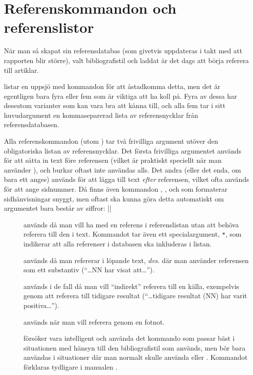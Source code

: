 \documentclass[10pt,../../a4.tex]{subfiles}
\begin{document}
\section{Referenskommandon och referenslistor}
När man så skapat sin referensdatabas (som givetvis uppdateras i takt med
att rapporten blir större), valt bibliografistil och laddat
 är det dags att börja referera till artiklar.

\Textcite[\ppno~79\psqq]{Lehman13} listar en uppsjö med kommandon för att
åstadkomma detta, men det är egentligen bara fyra eller fem som är viktiga
att ha koll på. Fyra av dessa har dessutom varianter som kan vara bra att
känna till, och alla fem tar i sitt huvudargument en kommaseparerad lista
av referensnycklar från referensdatabasen.

Alla referenskommandon (utom ) tar två frivilliga argument
utöver den obligatoriska listan av referensnycklar. Det första frivilliga
argumentet används för att sätta in text före referensen (vilket är
praktiskt speciellt när man använder ), och burkar oftast
inte användas alls. Det andra (eller det enda, om bara ett anges) används
för att lägga till text \emph{efter} referensen, vilket ofta används för
att ange sidnummer. Då finns även kommandon , ,
 och  som formaterar sidhänvisningar snyggt, men oftast
ska  kunna göra detta automatiskt om argumentet bara består
av siffror:
\latex|\parencite[12-14]{Lehman13}|

\begin{description}
	\item[] används då man vill ha med en referens i 
		referenslistan utan att behöva referera till den i text. Kommandot
		tar även ett specialargument, \texttt{*}, som indikerar att alla
		referenser i databasen ska inkluderas i listan.
	\item[] används då man refererar i löpande text, \emph{dvs.}
		där man använder referensen som ett substantiv
		(\enquote{\ldots{}NN har visat att\ldots}).
	\item[] används i de fall då man vill
		\enquote{indirekt} referera till en källa, exempelvis genom
		att referera till tidigare resultat (\enquote{\ldots{}tidigare
		resultat (NN) har varit positiva\ldots}).
	\item[] används när man vill referera genom en fotnot.
	\item[] försöker vara intelligent och använda det
		kommando som passar bäst i situationen med hänsyn till den
		bibliografistil som används, men bör bara användas i situationer
		där man normalt skulle använda  eller
		. Kommandot förklaras tydligare i manualen
		\parencite[\pno~82]{Lehman13}.
\end{description}
\end{document}
